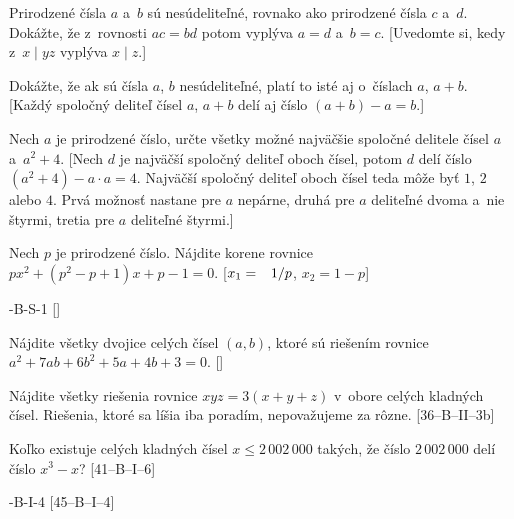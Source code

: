 {Prirodzené čísla $a$ a~$b$ sú nesúdeliteľné, rovnako ako
prirodzené čísla $c$ a~$d$. Dokážte, že z~rovnosti $ac=bd$ potom vyplýva
$a=d$ a~$b=c$. [Uvedomte si, kedy z~$x\mid yz$ vyplýva $x\mid z$.]

Dokážte, že ak sú čísla $a$, $b$ nesúdeliteľné, platí to isté aj o~číslach
$a$, $a+b$. [Každý spoločný deliteľ čísel $a$, $a+b$ delí aj číslo
$(a+b)-a=b$.]

Nech $a$ je prirodzené číslo, určte všetky možné najväčšie spoločné
delitele čísel $a$ a~$a^2+4$. [Nech $d$ je najväčší spoločný deliteľ
oboch čísel, potom $d$ delí číslo $(a^2+4)-a\cdot a=4$. Najväčší spoločný
deliteľ oboch čísel teda môže byť $1$, $2$ alebo $4$. Prvá možnosť nastane
pre $a$ nepárne, druhá pre $a$ deliteľné dvoma a~nie štyrmi, tretia pre $a$
deliteľné štyrmi.]

Nech $p$ je prirodzené číslo. Nájdite korene rovnice
$px^2+(p^2-p+1)x+p-1=0$. [$x_1=\m1/p$, $x_2=1-p$]

\D
{}-B-S-1
[]

Nájdite všetky dvojice celých čísel $(a,b)$, ktoré sú riešením rovnice
$a^2+7ab+6b^2+5a+4b+3=0$.
[]

Nájdite všetky riešenia rovnice $xyz=3(x+y+z)$ v~obore celých
kladných čísel. Riešenia, ktoré sa líšia iba poradím, nepovažujeme
za rôzne. [36--B--II--3b]

Koľko existuje celých kladných čísel $x\leq 2\,002\,000$
takých, že číslo $2\,002\,000$ delí číslo $x^3-x$? [41--B--I--6]

-B-I-4
[45--B--I--4]
}

